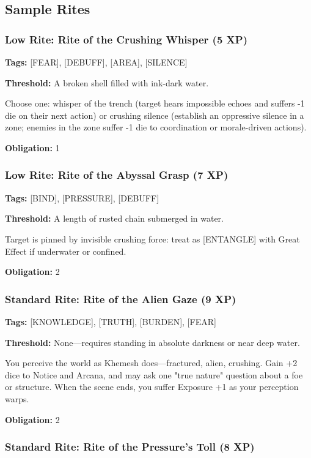 \subsection{Sample Rites}

\subsubsection{Low Rite: Rite of the Crushing Whisper (5 XP)}

\textbf{Tags:} [FEAR], [DEBUFF], [AREA], [SILENCE]

\textbf{Threshold:} A broken shell filled with ink-dark water.

Choose one: whisper of the trench (target hears impossible echoes and suffers -1 die on their next action) or crushing silence (establish an oppressive silence in a zone; enemies in the zone suffer -1 die to coordination or morale-driven actions).

\textbf{Obligation:} 1

\subsubsection{Low Rite: Rite of the Abyssal Grasp (7 XP)}

\textbf{Tags:} [BIND], [PRESSURE], [DEBUFF]

\textbf{Threshold:} A length of rusted chain submerged in water.

Target is pinned by invisible crushing force: treat as [ENTANGLE] with Great Effect if underwater or confined.

\textbf{Obligation:} 2

\subsubsection{Standard Rite: Rite of the Alien Gaze (9 XP)}

\textbf{Tags:} [KNOWLEDGE], [TRUTH], [BURDEN], [FEAR]

\textbf{Threshold:} None—requires standing in absolute darkness or near deep water.

You perceive the world as Khemesh does—fractured, alien, crushing. Gain +2 dice to Notice and Arcana, and may ask one "true nature" question about a foe or structure. When the scene ends, you suffer Exposure +1 as your perception warps.

\textbf{Obligation:} 2

\subsubsection{Standard Rite: Rite of the Pressure's Toll (8 XP)}

